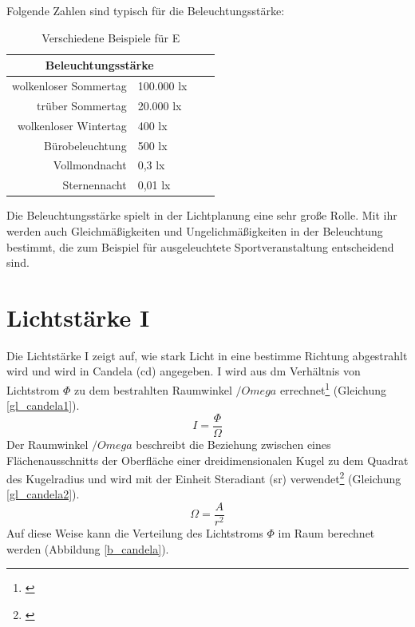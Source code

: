 
Folgende Zahlen sind typisch für die Beleuchtungsstärke:

\begin{table}[htp] 
		\centering
		\begin{tabular}{rlcc}  %
		\toprule
		\multicolumn{2}{c}{\large\sffamily Beleuchtungsstärke}\\ 							
		\midrule
		wolkenloser Sommertag & 100.000 lx\\
		trüber Sommertag & 20.000 lx\\
		wolkenloser Wintertag & 400 lx\\
		Bürobeleuchtung & 500 lx\\
		Vollmondnacht & 0,3 lx\\
		Sternennacht & 0,01 lx\\
		\bottomrule
		\end{tabular}
		\caption{Verschiedene Beispiele für E\protect\footnotemark}	
		\label{t_lux}
	\end{table}
Die Beleuchtungsstärke spielt in der Lichtplanung eine sehr große Rolle. Mit ihr werden auch Gleichmäßigkeiten und Ungelichmäßigkeiten in der Beleuchtung bestimmt, die zum Beispiel für ausgeleuchtete Sportveranstaltung entscheidend sind.

\section{Lichtstärke I}\label{sec_candela}
Die Lichtstärke I zeigt auf, wie stark Licht in eine bestimme Richtung abgestrahlt wird und wird in Candela (cd) angegeben. I wird aus dm Verhältnis von Lichtstrom $\Phi$ zu dem bestrahlten Raumwinkel $/Omega$ errechnet\footnote{\cite[27]{ris}} (Gleichung \ref{gl_candela1}).
 \begin{equation}\label{gl_candela1}
	I=\frac{\Phi}{\Omega}	
\end{equation}
Der Raumwinkel $/Omega$ beschreibt die Beziehung zwischen eines Flächenausschnitts der Oberfläche einer dreidimensionalen Kugel zu dem Quadrat des Kugelradius und wird mit der Einheit Steradiant (sr) verwendet\footnote{\cite[26]{ris}}  (Gleichung \ref{gl_candela2}).
 \begin{equation}\label{gl_candela2}
	\Omega=\frac{A}{r^{2}}	
\end{equation}
Auf diese Weise kann die Verteilung des Lichtstroms $\Phi$ im Raum berechnet werden (Abbildung \ref{b_candela}).

